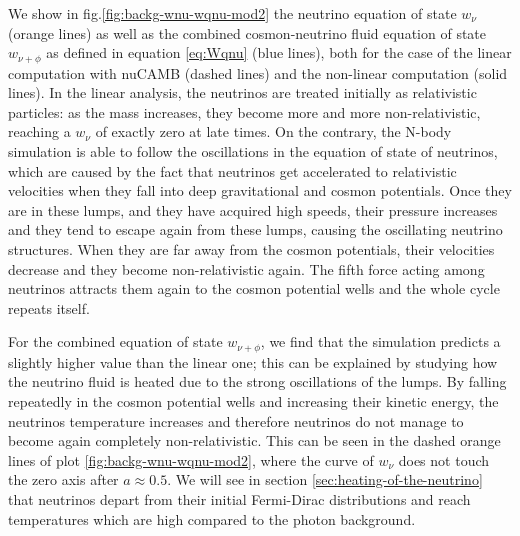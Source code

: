 We show in fig.\ref{fig:backg-wnu-wqnu-mod2} the neutrino equation
of state $w_{\nu}$ (orange lines) as well as the combined cosmon-neutrino
fluid equation of state $w_{\nu+\phi}$ as defined in equation \ref{eq:Wqnu}
(blue lines), both for the case of the linear computation with nuCAMB
(dashed lines) and the non-linear computation (solid lines). In the
linear analysis, the neutrinos are treated initially as relativistic
particles: as the mass increases, they become more and more non-relativistic,
reaching a $w_{\nu}$ of exactly zero at late times. On the contrary,
the N-body simulation is able to follow the oscillations in the equation
of state of neutrinos, which are caused by the fact that neutrinos
get accelerated to relativistic velocities when they fall into deep
gravitational and cosmon potentials. Once they are in these lumps,
and they have acquired high speeds, their pressure increases and they
tend to escape again from these lumps, causing the oscillating neutrino
structures. When they are far away from the cosmon potentials, their
velocities decrease and they become non-relativistic again. The fifth
force acting among neutrinos attracts them again to the cosmon potential
wells and the whole cycle repeats itself.

For the combined equation of state $w_{\nu+\phi}$, we find that the
simulation predicts a slightly higher value than the linear one; this
can be explained by studying how the neutrino fluid is heated due
to the strong oscillations of the lumps. By falling repeatedly in
the cosmon potential wells and increasing their kinetic energy, the
neutrinos temperature increases and therefore neutrinos do not manage
to become again completely non-relativistic. This can be seen in the
dashed orange lines of plot \ref{fig:backg-wnu-wqnu-mod2}, where
the curve of $w_{\nu}$ does not touch the zero axis after $a\approx0.5$.
We will see in section \ref{sec:heating-of-the-neutrino} that neutrinos
depart from their initial Fermi-Dirac distributions and reach temperatures
which are high compared to the photon background.

